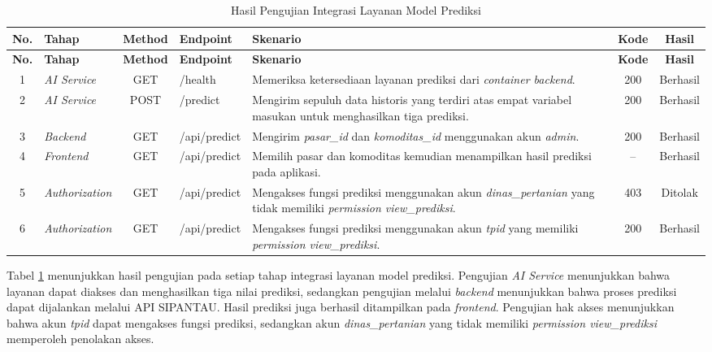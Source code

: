 \begin{longtable}{|c|p{2.3cm}|c|p{2.1cm}|p{2.4cm}|c|c|}
\caption{Hasil Pengujian Integrasi Layanan Model Prediksi}
\label{tab:pengujian-integrasi-prediksi} \\
\hline
\textbf{No.} & \textbf{Tahap} & \textbf{Method} & \textbf{Endpoint} & \textbf{Skenario} & \textbf{Kode} & \textbf{Hasil} \\
\hline
\endfirsthead

\hline
\textbf{No.} & \textbf{Tahap} & \textbf{Method} & \textbf{Endpoint} & \textbf{Skenario} & \textbf{Kode} & \textbf{Hasil} \\
\hline
\endhead

1 & \textit{AI Service} & GET & /health &
Memeriksa ketersediaan layanan prediksi dari \textit{container backend}. &
200 & Berhasil \\ \hline

2 & \textit{AI Service} & POST & /predict &
Mengirim sepuluh data historis yang terdiri atas empat variabel masukan untuk menghasilkan tiga prediksi. &
200 & Berhasil \\ \hline

3 & \textit{Backend} & GET & /api/predict &
Mengirim \textit{pasar\_id} dan \textit{komoditas\_id} menggunakan akun \textit{admin}. &
200 & Berhasil \\ \hline

4 & \textit{Frontend} & GET & /api/predict &
Memilih pasar dan komoditas kemudian menampilkan hasil prediksi pada aplikasi. &
-- & Berhasil \\ \hline

5 & \textit{Authorization} & GET & /api/predict &
Mengakses fungsi prediksi menggunakan akun \textit{dinas\_pertanian} yang tidak memiliki \textit{permission view\_prediksi}. &
403 & Ditolak \\ \hline

6 & \textit{Authorization} & GET & /api/predict &
Mengakses fungsi prediksi menggunakan akun \textit{tpid} yang memiliki \textit{permission view\_prediksi}. &
200 & Berhasil \\ \hline

\end{longtable}

Tabel \ref{tab:pengujian-integrasi-prediksi} menunjukkan hasil pengujian pada setiap tahap integrasi layanan model prediksi. Pengujian \textit{AI Service} menunjukkan bahwa layanan dapat diakses dan menghasilkan tiga nilai prediksi, sedangkan pengujian melalui \textit{backend} menunjukkan bahwa proses prediksi dapat dijalankan melalui API SIPANTAU. Hasil prediksi juga berhasil ditampilkan pada \textit{frontend}. Pengujian hak akses menunjukkan bahwa akun \textit{tpid} dapat mengakses fungsi prediksi, sedangkan akun \textit{dinas\_pertanian} yang tidak memiliki \textit{permission view\_prediksi} memperoleh penolakan akses.

